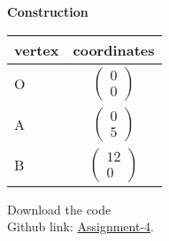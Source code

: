 \documentclass[10pt,a4paper]{report}
\begin{document}
\begin{multicols}{2}
 \vspace{2mm} \textbf{Construction}
\begin{center}
\setlength{\arrayrulewidth}{0.5mm}
\setlength{\tabcolsep}{6pt}
\renewcommand{\arraystretch}{1.5}
    \begin{tabular}{|l|c|}
    \hline 
    \textbf{vertex} & \textbf{coordinates} \\ \hline
   O & $ \begin{pmatrix} 
0 \\
0
\end{pmatrix} $ \\ \hline
    A & $\begin{pmatrix}
0 \\
5
\end{pmatrix}$   \\\hline
    B & $\begin{pmatrix}
12 \\
0
\end{pmatrix} $\\
    \hline
      \end{tabular}
  \end{center}
  
\raggedright  Download the code \\
Github link: \href{https://github.com/chiragshah1244/FWC/blob/main/assignments/assignment-1/code/src/seq.cpp}{Assignment-4}.
  \end{multicols}
\end{document}
